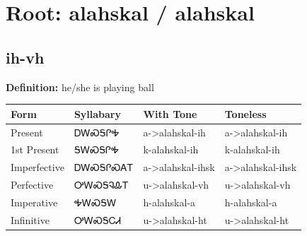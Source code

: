 \documentclass{article}%
\begin{document}
%
\normalsize%
\section*{Root: alahskal / alahskal}%
\subsection*{ih-vh}%
\textbf{Definition: }%
he/she is playing ball%
\\[0.5em]%
\begin{tabular}{|l|l|l|l|}%
\hline%
\textbf{Form}&\textbf{Syllabary}&\textbf{With Tone}&\textbf{Toneless}\\%
\hline%
Present&ᎠᎳᏍᎦᎵᎭ&a{-}>alahskal{-}ih&a{-}>alahskal{-}ih\\%
1st Present&ᎦᎳᏍᎦᎵᎭ&k{-}alahskal{-}ih&k{-}alahskal{-}ih\\%
Imperfective&ᎠᎳᏍᎦᎵᏍᎪᎢ&a{-}>alahskal{-}ihsk&a{-}>alahskal{-}ihsk\\%
Perfective&ᎤᎳᏍᎦᎸᎲᎢ&u{-}>alahskal{-}vh&u{-}>alahskal{-}vh\\%
Imperative&ᎭᎳᏍᎦᎳ&h{-}alahskal{-}a&h{-}alahskal{-}a\\%
Infinitive&ᎤᎳᏍᎦᏟᏗ&u{-}>alahskal{-}ht&u{-}>alahskal{-}ht\\%
\hline%
\end{tabular}%
\\[1em]%
\end{document}
